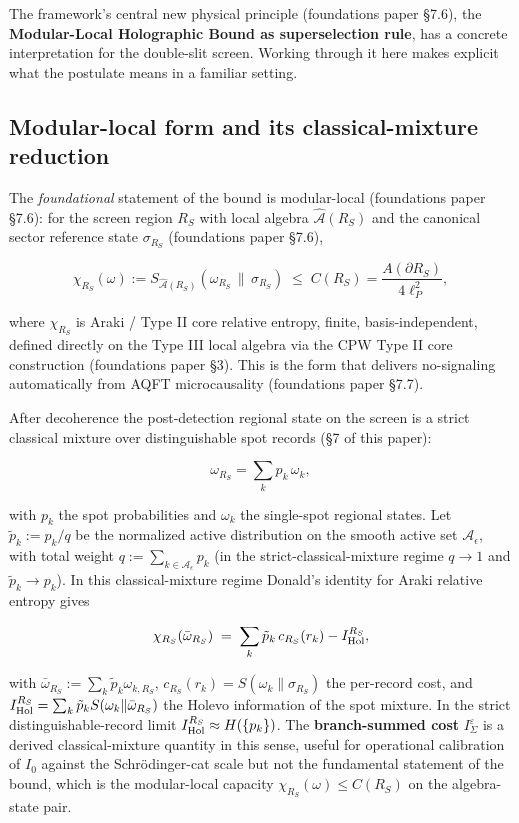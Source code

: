 \documentclass[11pt,a4paper]{article}
\begin{document}
The framework's central new physical principle (foundations paper §7.6), the \textbf{Modular-Local Holographic Bound as superselection rule}, has a concrete interpretation for the double-slit screen. Working through it here makes explicit what the postulate means in a familiar setting.

\subsection{Modular-local form and its classical-mixture reduction}

The \emph{foundational} statement of the bound is modular-local (foundations paper §7.6): for the screen region $R_S$ with local algebra $\hat{\mathcal{A}}(R_S)$ and the canonical sector reference state $\sigma_{R_S}$ (foundations paper §7.6),

\[
\chi_{R_S}(\omega) := S_{\hat{\mathcal{A}}(R_S)}(\omega_{R_S} \,\|\, \sigma_{R_S}) \;\le\; C(R_S) = \frac{A(\partial R_S)}{4\ell_P^2},
\]

where $\chi_{R_S}$ is Araki / Type II core relative entropy, finite, basis-independent, defined directly on the Type III local algebra via the CPW Type II core construction (foundations paper §3). This is the form that delivers no-signaling automatically from AQFT microcausality (foundations paper §7.7).

After decoherence the post-detection regional state on the screen is a strict classical mixture over distinguishable spot records (§7 of this paper):

\[
\omega_{R_S} = \sum_k p_k \,\omega_k,
\]

with $p_k$ the spot probabilities and $\omega_k$ the single-spot regional states. Let $\tilde p_k := p_k / q$ be the normalized active distribution on the smooth active set $\mathcal{A}_\epsilon$, with total weight $q := \sum_{k \in \mathcal{A}_\epsilon} p_k$ (in the strict-classical-mixture regime $q \to 1$ and $\tilde p_k \to p_k$). In this classical-mixture regime Donald's identity for Araki relative entropy gives

\[
\chi_{R_S}(\bar\omega_{R_S}) \;=\; \sum_k \tilde p_k\, c_{R_S}(r_k) - I_{\rm Hol}^{R_S},
\]

with $\bar\omega_{R_S} := \sum_k \tilde p_k \omega_{k,R_S}$, $c_{R_S}(r_k) = S(\omega_k \| \sigma_{R_S})$ the per-record cost, and $I_{\rm Hol}^{R_S} = \sum_k \tilde p_k S(\omega_k \| \bar\omega_{R_S})$ the Holevo information of the spot mixture. In the strict distinguishable-record limit $I_{\rm Hol}^{R_S} \approx H(\{p_k\})$. The \textbf{branch-summed cost} $I_\Sigma^\varepsilon$ is a derived classical-mixture quantity in this sense, useful for operational calibration of $I_0$ against the Schrödinger-cat scale but not the fundamental statement of the bound, which is the modular-local capacity $\chi_{R_S}(\omega) \le C(R_S)$ on the algebra-state pair.
\end{document}
